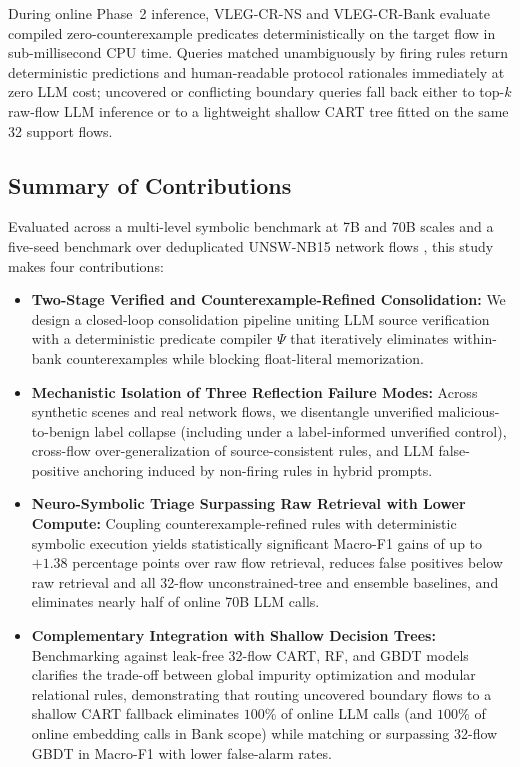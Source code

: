 \documentclass[11pt,letterpaper,onecolumn]{article}
\begin{document}
During online Phase~2 inference, VLEG-CR-NS and VLEG-CR-Bank evaluate compiled zero-counterexample predicates deterministically on the target flow in sub-millisecond CPU time. Queries matched unambiguously by firing rules return deterministic predictions and human-readable protocol rationales immediately at zero LLM cost; uncovered or conflicting boundary queries fall back either to top-$k$ raw-flow LLM inference or to a lightweight shallow CART tree fitted on the same 32 support flows.

\subsection{Summary of Contributions}
Evaluated across a multi-level symbolic benchmark at 7B and 70B scales and a five-seed benchmark over deduplicated UNSW-NB15 network flows \cite{moustafa2015unsw}, this study makes four contributions:
\begin{itemize}[leftmargin=1.8em,topsep=2pt,itemsep=2pt]
    \item \textbf{Two-Stage Verified and Counterexample-Refined Consolidation:} We design a closed-loop consolidation pipeline uniting LLM source verification with a deterministic predicate compiler $\Psi$ that iteratively eliminates within-bank counterexamples while blocking float-literal memorization.
    \item \textbf{Mechanistic Isolation of Three Reflection Failure Modes:} Across synthetic scenes and real network flows, we disentangle unverified malicious-to-benign label collapse (including under a label-informed unverified control), cross-flow over-generalization of source-consistent rules, and LLM false-positive anchoring induced by non-firing rules in hybrid prompts.
    \item \textbf{Neuro-Symbolic Triage Surpassing Raw Retrieval with Lower Compute:} Coupling counterexample-refined rules with deterministic symbolic execution yields statistically significant Macro-F1 gains of up to $+1.38$ percentage points over raw flow retrieval, reduces false positives below raw retrieval and all 32-flow unconstrained-tree and ensemble baselines, and eliminates nearly half of online 70B LLM calls.
    \item \textbf{Complementary Integration with Shallow Decision Trees:} Benchmarking against leak-free 32-flow CART, RF, and GBDT models clarifies the trade-off between global impurity optimization and modular relational rules, demonstrating that routing uncovered boundary flows to a shallow CART fallback eliminates $100\%$ of online LLM calls (and $100\%$ of online embedding calls in Bank scope) while matching or surpassing 32-flow GBDT in Macro-F1 with lower false-alarm rates.
\end{itemize}
\end{document}

